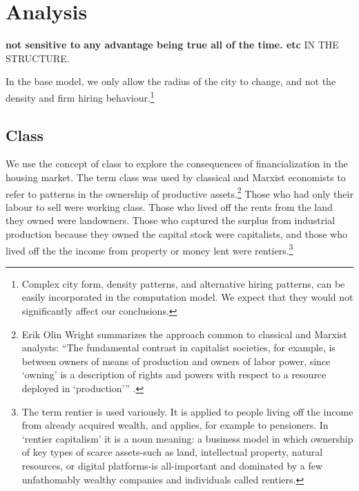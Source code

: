 \chapter{Analysis} \label{chapter-analysis}


\textbf{not sensitive to any advantage being true all of the time. etc } IN THE STRUCTURE.


In the base model, we only allow the radius of the city to change, and not the density and firm hiring behaviour.\footnote{Complex city form, density patterns, and alternative hiring patterns, can be easily incorporated in the computation model. We expect that they would not significantly affect our conclusions.}  




\section{Class}
We use the concept of \gls{class}  to explore the consequences  of financialization in the housing market. The term class was  used  by classical and Marxist economists to refer to patterns in the ownership of productive assets.\footnote{ Erik Olin Wright summarizes the approach common to classical and Marxist analysts:  ``The fundamental contrast in capitalist societies, for example, is between owners of means of production and owners of labor power, since `owning' is a description of rights and powers with respect to a resource deployed in `production'\thinspace'' \cite{wrightAlternativeFoundationsClass2002}.} Those who had only their labour to sell were \gls{working class}. Those who lived off the rents from the land they owned were \glspl{landowner}. Those who captured the surplus from industrial production because they owned the capital stock were capitalists, and those who lived off the the income from property or money lent were \glspl{rentier}.\footnote{The term rentier is used variously. It is applied to people living off the income from already acquired wealth, and applies, for example to pensioners.  In `rentier capitalism' it is a noun meaning: a business model in which ownership of key types of scarce assets-such as land, intellectual property, natural resources, or digital platforms-is all-important and dominated by a few unfathomably wealthy companies and individuals called rentiers.} 

